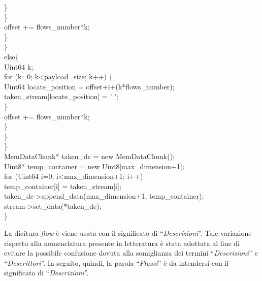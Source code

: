 \begin{code}
						\}\\
					\}\\
					offset += flows\_number*k;\\
				\}\\
			\}\\
			else\{\\
				Uint64 k;\\
				for (k=0; k<payload\_size; k++) \{\\
					Uint64 locate\_position = offset+i+(k*flows\_number);\\
					taken\_stream[locate\_position] = ' ';\\
				\}\\
				offset += flows\_number*k;\\
			\}\\
		\}\\
	\}\\
	MemDataChunk* taken\_dc = new MemDataChunk();\\
	Uint8* temp\_container = new Uint8[max\_dimension+1];\\
	for (Uint64 i=0; i<max\_dimension+1; i++)\\
		temp\_container[i] = taken\_stream[i];\\
	taken\_dc->append\_data(max\_dimension+1, temp\_container);\\
	stream->set\_data(*taken\_dc);\\
\}\\
\end{code}

\begin{notabene}
La dicitura \textit{flow} \`e viene usata con il significato di ``\emph{Descrizioni}''. Tale variazione rispetto alla nomenclatura presente in letteratura \`e stata adottata al fine di evitare la possibile confusione dovuta alla somiglianza dei termini ``\emph{Descrizioni}'' e ``\emph{Descrittori}''. In seguito, quindi, la parola ``\emph{Flussi}'' \`e da intendersi con il significato di ``\emph{Descrizioni}''.
\end{notabene}